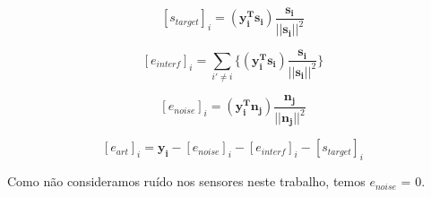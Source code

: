    \begin{equation}
        \label{eq:star}
         [s_{target}]_i  = (\mathbf{y_i^Ts_i})\frac{\mathbf{s_i}}{||\mathbf{s_i}||^2}
    \end{equation}
    
    \medskip
    
    \begin{equation}
        \label{eq:eint}
         [e_{interf}]_i  = \sum_{i' \neq i} \{(\mathbf{y_i^Ts_i})\frac{\mathbf{s_i}}{||\mathbf{s_i}||^2}\}
    \end{equation}
    
    \medskip
    
    \begin{equation}
        \label{eq:enoise}
         [e_{noise}]_i  = (\mathbf{y_i^Tn_j})\frac{\mathbf{n_j}}{||\mathbf{n_j}||^2}
    \end{equation}
    
    \medskip
    
        \begin{equation}
        \label{eq:eart}
         [e_{art}]_i  = \mathbf{y_i} -  [e_{noise}]_i -  [e_{interf}]_i - [s_{target}]_i 
    \end{equation}
    
    Como não consideramos ruído nos sensores neste trabalho, temos $e_{noise}$ = 0.
    
    
